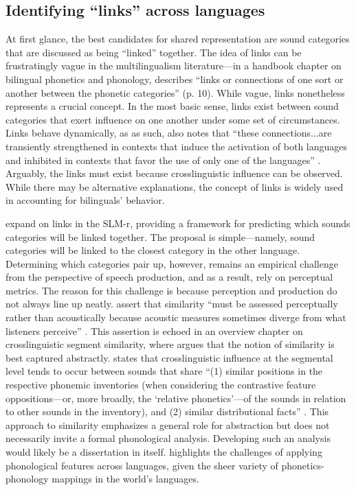 \subsection{Identifying ``links'' across languages}\label{ch4:sec:links}

At first glance, the best candidates for shared representation are sound categories that are discussed as being ``linked'' together. The idea of links can be frustratingly vague in the multilingualism literature---in a handbook chapter on bilingual phonetics and phonology, \citet{simonet_2016_bilingualism} describes ``links or connections of one sort or another between the phonetic categories'' (p. 10). While vague, links nonetheless represents a crucial concept. In the most basic sense, links exist between sound categories that exert influence on one another under some set of circumstances. Links behave dynamically, as as such,  \citeauthor{simonet_2016_bilingualism} also notes that ``these connections...are transiently strengthened in contexts that induce the activation of both languages and inhibited in contexts that favor the use of only one of the languages'' \citeyearpar[][p. 10]{simonet_2016_bilingualism}. Arguably, the links must exist because crosslinguistic influence can be observed. While there may be alternative explanations, the concept of links is widely used in accounting for bilinguals' behavior. 

\citet{flege_2021_slmr} expand on links in the SLM-r, providing a framework for predicting which sounds categories will be linked together. The proposal is simple---namely, sound categories will be linked to the closest category in the other language. Determining which categories pair up, however, remains an empirical challenge from the perspective of speech production, and as a result, \citet{flege_2021_slmr} rely on perceptual metrics. The reason for this challenge is because perception and production do not always line up neatly. \citeauthor{flege_2021_slmr} assert that similarity ``must be assessed perceptually rather than acoustically because acoustic measures sometimes diverge from what listeners perceive'' \citeyearpar[][p. 33]{flege_2021_slmr}. This assertion is echoed in an overview chapter on crosslinguistic segment similarity, where \citet{chang_2015_similarity} argues that the notion of similarity is best captured abstractly. \citeauthor{chang_2015_similarity} states that crosslinguistic influence at the segmental level tends to occur between sounds that share ``(1) similar positions in the respective phonemic inventories (when considering the contrastive feature oppositions---or, more broadly, the `relative phonetics'---of the sounds in relation to other sounds in the inventory), and (2) similar distributional facts'' \citeyearpar[][p. 201]{chang_2015_similarity}. This approach to similarity emphasizes a general role for abstraction but does not necessarily invite a formal phonological analysis. Developing such an analysis would likely be a dissertation in itself. \citet{mielke_2012_similarity} highlights the challenges of applying phonological features across languages, given the sheer variety of phonetics-phonology mappings in the world's languages. 

